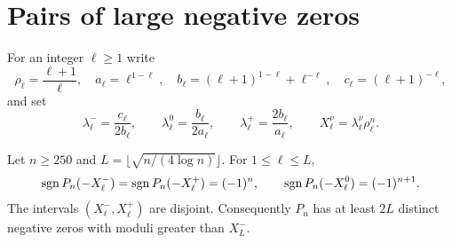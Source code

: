 \section{Pairs of large negative zeros}

For an integer $\ell\ge1$ write
\[
\rho_\ell=\frac{\ell+1}{\ell},\quad
a_\ell=\ell^{1-\ell},\quad
b_\ell=(\ell+1)^{1-\ell}+\ell^{-\ell},\quad
c_\ell=(\ell+1)^{-\ell},
\]
and set
\begin{equation}\label{eq:outer-separators}
\lambda_\ell^-=\frac{c_\ell}{2b_\ell},\qquad
\lambda_\ell^0=\frac{b_\ell}{2a_\ell},\qquad
\lambda_\ell^+=\frac{2b_\ell}{a_\ell},\qquad
X_\ell^\nu=\lambda_\ell^\nu\rho_\ell^n.
\end{equation}

\begin{lemma}\label{lem:outer}
Let $n\ge250$ and $L=\lfloor\sqrt{n/(4\log n)}\rfloor$. For $1\le\ell\le L$,
\[
\operatorname{sgn} P_n(-X_\ell^-)=\operatorname{sgn} P_n(-X_\ell^+)=(-1)^n,\qquad
\operatorname{sgn} P_n(-X_\ell^0)=(-1)^{n+1}.
\]
The intervals $(X_\ell^-,X_\ell^+)$ are disjoint. Consequently $P_n$ has at least $2L$ distinct negative zeros with moduli greater than $X_L^-$.
\end{lemma}

